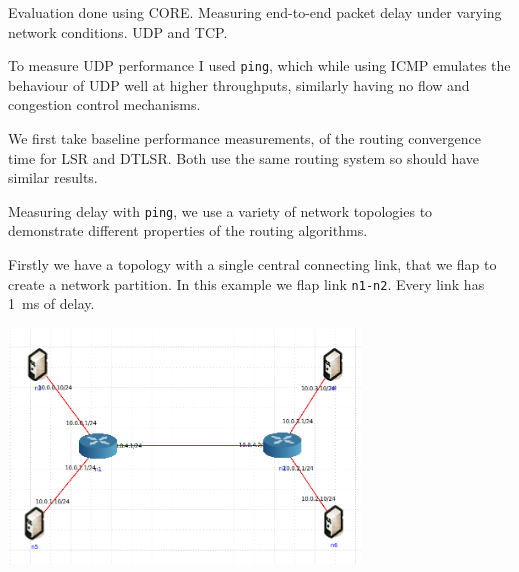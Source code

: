 \documentclass[10pt,twoside,a4paper]{article}
\begin{document}
Evaluation done using CORE. Measuring end-to-end packet delay under varying network conditions. UDP and TCP.

To measure UDP performance I used \texttt{ping}, which while using ICMP emulates the behaviour of UDP well at higher throughputs, similarly having no flow and congestion control mechanisms.

We first take baseline performance measurements, of the routing convergence time for LSR and DTLSR. Both use the same routing system so should have similar results.

Measuring delay with \texttt{ping}, we use a variety of network topologies to demonstrate different properties of the routing algorithms.

Firstly we have a topology with a single central connecting link, that we flap to create a network partition. In this example we flap link \texttt{n1-n2}. Every link has \SI{1}{\ms} of delay.

\begin{minipage}{1\textwidth} \centering
	\includegraphics[width=0.7\textwidth]{partition}
\end{minipage}
\end{document}

